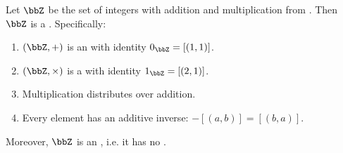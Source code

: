\begin{proposition} \label{proposition:integers_form_ring}
Let $\bbZ$ be the set of integers with addition and multiplication from . Then $\bbZ$ is a . Specifically:
\begin{enumerate}
    \item $(\bbZ, +)$ is an  with identity $0_\bbZ = [(1, 1)]$.
    \item $(\bbZ, \times)$ is a  with identity $1_\bbZ = [(2, 1)]$.
    \item Multiplication distributes over addition.
    \item Every element has an additive inverse: $-[(a, b)] = [(b, a)]$.
\end{enumerate}
Moreover, $\bbZ$ is an , i.e. it has no .
\end{proposition}

